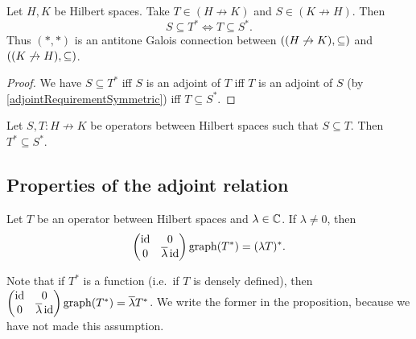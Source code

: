 \begin{proposition} \label{HilbertAdjointGaloisConnection}
Let $H, K$ be Hilbert spaces. Take $T\in (H\not\to K)$ and $S\in (K\not\to H)$. Then
\[ S \subseteq T^* \iff T\subseteq S^*. \]
Thus $(*,*)$ is an antitone Galois connection between $\sSet{(H\not\to K), \subseteq}$ and $\sSet{(K\not\to H), \subseteq}$.
\end{proposition}
\begin{proof}
We have $S \subseteq T^*$ iff $S$ is an adjoint of $T$ iff $T$ is an adjoint of $S$ (by \ref{adjointRequirementSymmetric}) iff $T\subseteq S^*$.
\end{proof}
\begin{corollary} \label{HilbertAdjointAntitone}
Let $S,T: H\not\to K$ be operators between Hilbert spaces such that $S\subseteq T$. Then $T^* \subseteq S^*$.
\end{corollary}
\subsection{Properties of the adjoint relation}

\begin{proposition}
Let $T$ be an operator between Hilbert spaces and $\lambda\in\mathbb{C}$. If $\lambda \neq 0$, then
\[ \begin{pmatrix}
\operatorname{id} & 0 \\ 0 & \overline{\lambda}\operatorname{id}
\end{pmatrix} \operatorname{graph}(T^*) = (\lambda T)^*. \]
\end{proposition}
Note that if $T^*$ is a function (i.e.\ if $T$ is densely defined), then $\begin{pmatrix}
\operatorname{id} & 0 \\ 0 & \overline{\lambda}\operatorname{id}
\end{pmatrix} \operatorname{graph}(T^*) = \overline{\lambda}T^*$. We write the former in the proposition, because we have not made this assumption.

